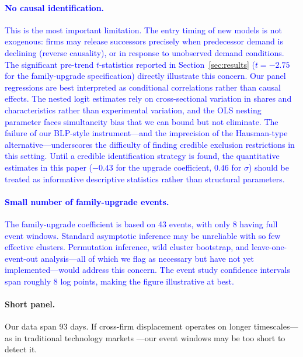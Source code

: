 \documentclass[11pt, a4paper]{article}
\begin{document}
\textcolor{blue}{\paragraph{No causal identification.} This is the most important limitation. The entry timing of new models is not exogenous: firms may release successors precisely when predecessor demand is declining (reverse causality), or in response to unobserved demand conditions. The significant pre-trend $t$-statistics reported in Section~\ref{sec:results} ($t = -2.75$ for the family-upgrade specification) directly illustrate this concern. Our panel regressions are best interpreted as conditional correlations rather than causal effects. The nested logit estimates rely on cross-sectional variation in shares and characteristics rather than experimental variation, and the OLS nesting parameter faces simultaneity bias that we can bound but not eliminate. The failure of our BLP-style instrument---and the imprecision of the Hausman-type alternative---underscores the difficulty of finding credible exclusion restrictions in this setting. Until a credible identification strategy is found, the quantitative estimates in this paper ($-0.43$ for the upgrade coefficient, $0.46$ for $\sigma$) should be treated as informative descriptive statistics rather than structural parameters.}

\textcolor{blue}{\paragraph{Small number of family-upgrade events.} The family-upgrade coefficient is based on 43 events, with only 8 having full event windows. Standard asymptotic inference may be unreliable with so few effective clusters. Permutation inference, wild cluster bootstrap, and leave-one-event-out analysis---all of which we flag as necessary but have not yet implemented---would address this concern. The event study confidence intervals span roughly 8 log points, making the figure illustrative at best.}

\paragraph{Short panel.} Our data span 93 days. If cross-firm displacement operates on longer timescales---as in traditional technology markets \citep{bresnahan1999technological}---our event windows may be too short to detect it.
\end{document}
